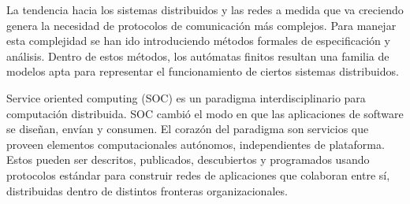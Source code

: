 La tendencia hacia los sistemas distribuidos y las redes a medida que va creciendo genera la necesidad de protocolos de comunicación más complejos. Para manejar esta complejidad se han ido introduciendo métodos formales de especificación y análisis. Dentro de estos métodos, los autómatas finitos resultan una familia de modelos apta para representar el funcionamiento de ciertos sistemas distribuidos.

Service oriented computing (SOC) es un paradigma interdisciplinario para computación distribuida. SOC cambió el modo en que las aplicaciones de software se diseñan, envían y consumen. El corazón del paradigma son servicios que proveen elementos computacionales autónomos, independientes de plataforma. Estos pueden ser descritos, publicados, descubiertos y programados usando protocolos estándar para construir redes de aplicaciones que colaboran entre sí, distribuidas dentro de distintos fronteras organizacionales.

 